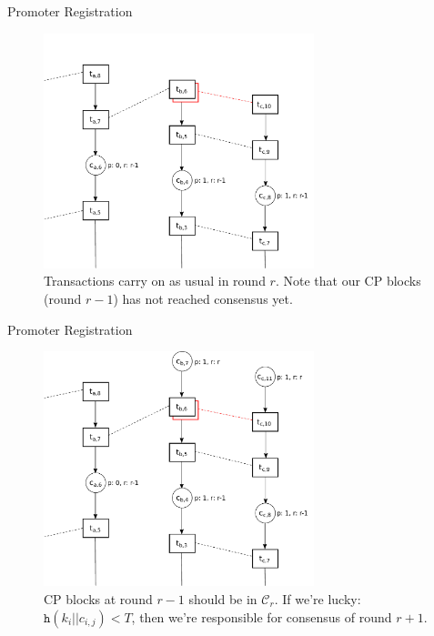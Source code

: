 \documentclass{beamer}
\begin{document}
\begin{frame}{Promoter Registration}

  \begin{figure}[h]
  \includegraphics[width=0.7\textwidth]{figures/trustchain-3}
  \centering
  \caption{Transactions carry on as usual in round $r$. Note that our CP blocks
    (round $r - 1$) has not reached consensus yet.}
  \end{figure}

\end{frame}

\begin{frame}{Promoter Registration}

  \begin{figure}[h]
  \includegraphics[width=0.7\textwidth]{figures/trustchain-4}
  \centering
  \caption{CP blocks at round $r-1$ should be in $\mathcal{C}_r$. If we're
    lucky: $\texttt{h}(k_i || c_{i,j}) < T$, then we're responsible for
    consensus of round $r + 1$.}
  \end{figure}

\end{frame}
\end{document}
